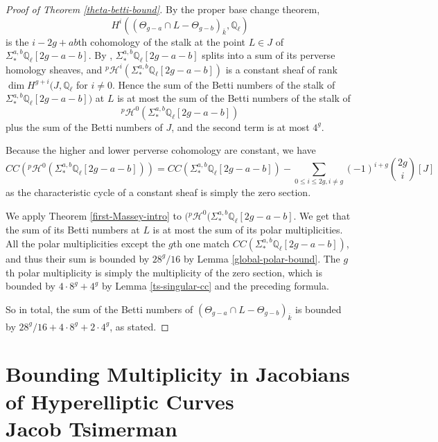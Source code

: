\documentclass[12pt]{amsart}
\theoremstyle{definition}
\theoremstyle{remark}
\begin{document}
\begin{proof}[Proof of Theorem \ref{theta-betti-bound}]  By the proper base change theorem, \[ H^i (  (\Theta_{g-a} \cap L - \Theta_{g-b} )_{\overline{k}}, \mathbb Q_\ell)\] is the $i-2g+ab$th cohomology of the stalk at the point $L \in J$ of $ \Sigma^{a,b}_* \mathbb Q_\ell[2g-a-b]$. By \citep[Lemma 3.1 and Lemma 3.6]{TS}, $\Sigma^{a,b}_* \mathbb Q_\ell[2g-a-b] $ splits into a sum of its perverse homology sheaves, and ${}^p \mathcal H^i ( \Sigma^{a,b}_* \mathbb Q_\ell[2g-a-b] )$ is a constant sheaf of rank $\dim H^{g+i} (J,\mathbb Q_\ell$ for $i \neq 0$. Hence the sum of the Betti numbers of the stalk of  $ \Sigma^{a,b}_* \mathbb Q_\ell[2g-a-b] )$
at $L$ is at most the sum of the Betti numbers of the stalk of \[ {}^p \mathcal H^0 ( \Sigma^{a,b}_* \mathbb Q_\ell[2g-a-b] )\] plus the sum of the Betti numbers of $J$, and the second term is at most $4^g$.

Because the higher and lower perverse cohomology are constant, we have \[ CC \left( {}^p \mathcal H^0 ( \Sigma^{a,b}_* \mathbb Q_\ell[2g-a-b] )\right) = CC \left( \Sigma^{a,b}_* \mathbb Q_\ell[2g-a-b]  \right) - \sum_{0 \leq i \leq 2g, i\neq g} (-1)^{i+g } {2g \choose i} [ J] \] as the characteristic cycle of a constant sheaf is simply the zero section.

We apply Theorem \ref{first-Massey-intro} to $( {}^p \mathcal H^0 ( \Sigma^{a,b}_* \mathbb Q_\ell[2g-a-b] $. We get that the sum of its Betti numbers at $L$ is at most the sum of its polar multiplicities. All the polar multiplicities except the $g$th one match $CC \left( \Sigma^{a,b}_* \mathbb Q_\ell[2g-a-b]  \right) $, and thus their sum is bounded by $28^g/16$ by Lemma \ref{global-polar-bound}. The $g$th polar multiplicity is simply the multiplicity of the zero section, which is bounded by $4 \cdot 8^g + 4^g $ by Lemma \ref{ts-singular-cc} and the preceding formula.

So in total, the sum of the Betti numbers of $(\Theta_{g-a} \cap L - \Theta_{g-b} )_{\overline{k}}$ is bounded by $28^g/16 + 4 \cdot 8^g + 2\cdot 4^g$, as stated.

 \end{proof}


\appendix

\section[Bounding Multiplicity in Jacobians of Hyperelliptic curves]{ Bounding Multiplicity in Jacobians of Hyperelliptic Curves\\ \vspace{5pt} Jacob Tsimerman}
\end{document}
